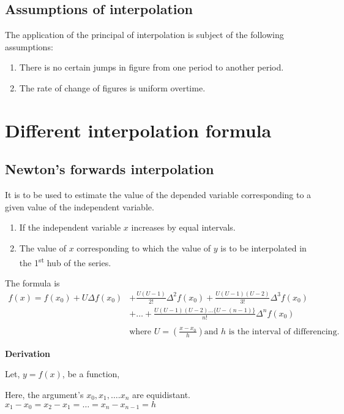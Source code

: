 \documentclass[11pt, a4paper]{article}
\begin{document}
\subsection{Assumptions of interpolation}
The application of the principal of interpolation is subject of the following
assumptions:
\begin{enumerate}
  \item There is no certain jumps in figure from one period to another period.
  \item The rate of change of figures is uniform overtime.
\end{enumerate}

\section{Different interpolation formula}
\subsection{Newton's forwards interpolation}
It is to be used to estimate the value of the depended variable corresponding 
to a given value of the independent variable.
\begin{enumerate}
  \item If the independent variable $x$ increases by equal intervals.
  \item The value of $x$ corresponding to which the value of $y$ is to be 
    interpolated in the 1\textsuperscript{st} hub of the series.
\end{enumerate}

The formula is 
\begin{align*}
  f(x)=f(x_0)+U\Delta f(x_0) &+ \frac{U(U-1)}{2!}\Delta^2f(x_0)+\frac{U(U-1)
  (U-2)}{3!}\Delta^3f(x_0)\\
                             &+ \dots+\frac{U(U-1)(U-2)\dots\{U-(n-1)\}}{n!}
                             \Delta^nf(x_0)\\
                             \\
                             &\text{where }U=(\frac{x-x_0}{h})\text{and }h
                             \text{ is the interval of differencing.}
\end{align*}

\begin{tcolorbox}
  \centering
  \Large
  \bfseries
  Derivation
\end{tcolorbox}
Let, $y=f(x)$, be a function,

Here, the argument's $x_0,x_1,\dots.x_n$ are equidistant. $x_1-x_0=x_2-x_1=\dots=x_n-x_{n-1}=h$
\end{document}
